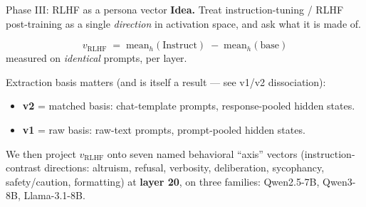 \documentclass[aspectratio=169,11pt]{beamer}
\begin{document}

\begin{frame}{Phase III: RLHF as a persona vector}
  \textbf{Idea.} Treat instruction-tuning / RLHF post-training as a single
  \emph{direction} in activation space, and ask what it is made of.

  \vspace{0.8em}
  \[
    v_{\mathrm{RLHF}} \;=\; \mathrm{mean}_h(\text{Instruct}) \;-\; \mathrm{mean}_h(\text{base})
  \]
  measured on \emph{identical} prompts, per layer.

  \vspace{0.8em}
  Extraction basis matters (and is itself a result --- see v1/v2 dissociation):
  \begin{itemize}
    \item \textbf{v2} = matched basis: chat-template prompts, response-pooled hidden states.
    \item \textbf{v1} = raw basis: raw-text prompts, prompt-pooled hidden states.
  \end{itemize}

  \vspace{0.6em}
  We then project $v_{\mathrm{RLHF}}$ onto seven named behavioral ``axis'' vectors
  (instruction-contrast directions: altruism, refusal, verbosity, deliberation,
  sycophancy, safety/caution, formatting) at \textbf{layer 20}, on three families:
  Qwen2.5-7B, Qwen3-8B, Llama-3.1-8B.
\end{frame}
\end{document}
